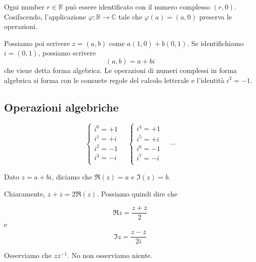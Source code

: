 \documentclass[a4paper]{article}
\begin{document}
Ogni number \(r\in\mathbb{R}\) può essere identificato con il numero complesso \((r, 0)\).
Cosifacendo, l'applicazione \(\varphi\colon \mathbb{R} \to \mathbb{C}\)
tale che \(\varphi(a) = (a,0)\) preserva le operazioni.

Possiamo poi scrivere \(z=(a,b)\) come \(a(1,0) + b(0,1)\).
Se identifichiamo \(i=(0,1)\), possiamo scrivere
\[
    (a,b) = a+bi
\]
che viene detta forma algebrica.
Le operazioni di numeri complessi in forma algebrica si forma con le consuete regole del calcolo letterale
e l'identità \(i^2 = -1\).

\subsection{Operazioni algebriche}

\[
    \begin{cases}
        i^0=+1\\
        i^1=+i\\
        i^2=-1\\
        i^3=-i\\
    \end{cases}
    \quad
    \begin{cases}
        i^4=+1\\
        i^5=+i\\
        i^6=-1\\
        i^7=-i\\
    \end{cases}
    \quad
    \cdots
\]

Dato \(z=a+bi\), diciamo che \(\Re(z) =a\) e \(\Im(z) = b\).


Chiaramente, \(z + \overline{z} = 2\Re(z)\). Possiamo quindi dire che

\[
    \Re z = \frac{z + \overline{z}}{2}
\]
e
\[
    \Im z = \frac{z-\overline{z}}{2i}
\]


Osserviamo che \(zz^{-1}\).
No non osserviamo niente.
\end{document}
